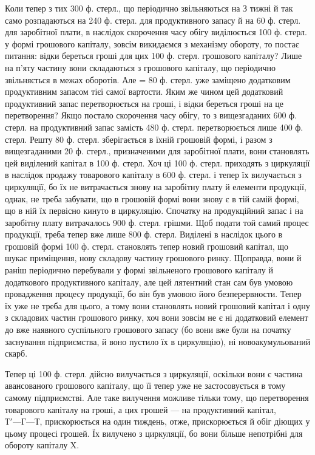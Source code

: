 Коли тепер з тих 300 ф. стерл., що періодично звільняються на З
тижні й так само розпадаються на 240 ф. стерл. для продуктивного запасу
й на 60 ф. стерл. для заробітної плати, в наслідок скорочення часу
обігу виділюється 100 ф. стерл. у формі грошового капіталу, зовсім викидаємся
з механізму обороту, то постає питання: відки береться гроші
для цих 100 ф. стерл. грошового капіталу? Лише на п’яту частину вони
складаються з грошового капіталу, що періодично звільняється в межах
оборотів. Але  = 80 ф. стерл. уже заміщено додатковим продуктивним
запасом тієї самої вартости. Яким же чином цей додатковий продуктивний
запас перетворюється на гроші, і відки береться гроші на це перетворення?
Якщо постало скорочення часу обігу, то з вищезгаданих 600 ф. стерл.
на продуктивний запас замість 480 ф. стерл. перетворюється лише 400 ф.
стерл. Решту 80 ф. стерл. зберігається в їхній грошовій формі, і
разом з вищезгаданими 20 ф. стерл., призначеними для заробітної плати,
вони становлять цей виділений капітал в 100 ф. стерл. Хоч ці 100 ф.
стерл. приходять з циркуляції в наслідок продажу товарового капіталу в
600 ф. стерл. і тепер їх вилучається з циркуляції, бо їх не витрачається
знову на заробітну плату й елементи продукції, однак, не треба забувати,
що в грошовій формі вони знову є в тій самій формі, що в ній їх
первісно кинуто в циркуляцію. Спочатку на продукційний запас і на заробітну
плату витрачалось 900 ф. стерл. грішми. Щоб подати той
самий процес продукції, треба тепер вже лише 800 ф. стерл. Виділені в
наслідок цього в грошовій формі 100 ф. стерл. становлять тепер новий
грошовий капітал, що шукає приміщення, нову складову частину грошового
ринку. Щоправда, вони й раніш періодично перебували у формі
звільненого грошового капіталу й додаткового продуктивного капіталу,
але цей лятентний стан сам був умовою провадження процесу продукції,
бо він був умовою його безперервности. Тепер їх уже не треба для
цього, а тому вони становлять новий грошовий капітал і одну з складових
частин грошового ринку, хоч вони зовсім не є ні додатковий елемент
до вже наявного суспільного грошового запасу (бо вони вже були
на початку заснування підприємства, й воно пустило їх в циркуляцію),
ні новоакумульований скарб.

Тепер ці 100 ф. стерл. дійсно вилучається з циркуляції, оскільки вони
є частина авансованого грошового капіталу, що її тепер уже не застосовується
в тому самому підприємстві. Але таке вилучення можливе
тільки тому, що перетворення товарового капіталу на гроші, а цих грошей
— на продуктивний капітал, $Т' — Г — Т$, прискорюється на один тиждень,
отже, прискорюється й обіг діющих у цьому процесі грошей. Їх вилучено
з циркуляції, бо вони більше непотрібні для обороту капіталу X.

